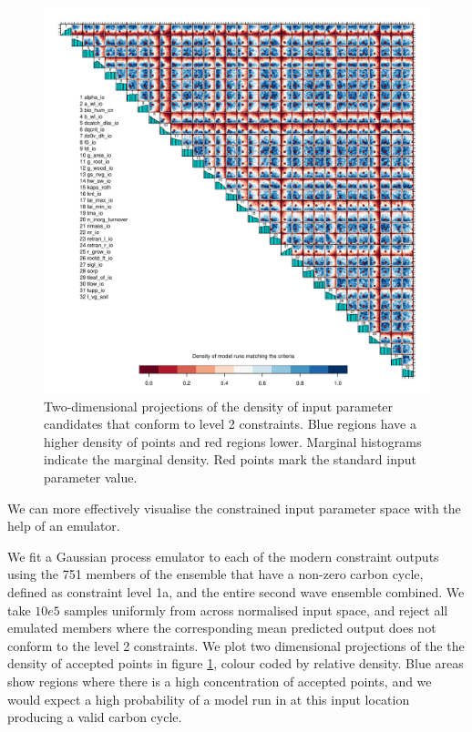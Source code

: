 \documentclass[gmd, manuscript]{copernicus}
\begin{document}
\begin{figure}[t]
\includegraphics[width=12cm]{./graphics/pairs_level2_ix_em_unif_wave00_wave01.pdf}
\caption{Two-dimensional projections of the density of input parameter candidates that conform to level 2 constraints. Blue regions have a higher density of points and red regions lower. Marginal histograms indicate the marginal density. Red points mark the standard input parameter value.}
\label{fig:pairs_level2_ix_em_unif_wave00_wave01}
\end{figure}

We can more effectively visualise the constrained input parameter space with the help of an emulator. 

We fit a Gaussian process emulator to each of the modern constraint outputs using the 751 members of the ensemble that have a non-zero carbon cycle, defined as constraint level 1a, and the entire second wave ensemble combined. We take $10e5$ samples uniformly from across normalised input space, and reject all emulated members where the corresponding mean predicted output does not conform to the level 2 constraints. We plot two dimensional projections of the the density of accepted points in figure \ref{fig:pairs_level2_ix_em_unif_wave00_wave01}, colour coded by relative density. Blue areas show regions where there is a high concentration of accepted points, and we would expect a high probability of a model run in at this input location producing a valid carbon cycle.
\end{document}
